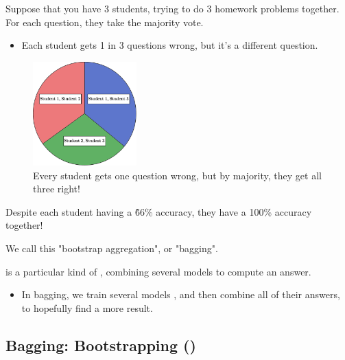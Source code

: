         \miniex Suppose that you have 3 students, trying to do 3 homework problems together. For each question, they take the majority vote.

        \begin{itemize}
            \item Each student gets 1 in 3 questions wrong, but it's a different question.
        \end{itemize}

        \begin{figure}[H]
            \centering
            \includegraphics[width=40mm,scale=0.5]{images/nonparametric_images/best_of_three.png}
            \caption*{Every student gets one question wrong, but by majority, they get all three right!}
        \end{figure}

        Despite each student having a \~66\% accuracy, they have a 100\% accuracy together!

        We call this "bootstrap aggregation", or "bagging".\\

        \begin{concept}
             is a particular kind of , combining several models to compute an answer.

            \begin{itemize}
                \item In bagging, we train several models , and then combine all of their answers, to hopefully find a more  result. 
            \end{itemize}
        \end{concept}




    \phantom{}
    
    \subsection{Bagging: Bootstrapping ()}

